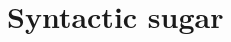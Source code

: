 \documentclass[output=book
	      ,nonflat
	      ,modfonts,
	      ,colorlinks
	      ,biblatex
	      ,showindex
	      ]{langsci/langscibook}
\begin{document}
%  
%  
% 
% 
% 
% 
% 
%  
%  
%  

%  
 
%  
%  
%  
%  
%  
\section{Syntactic sugar}
 

\end{document}
